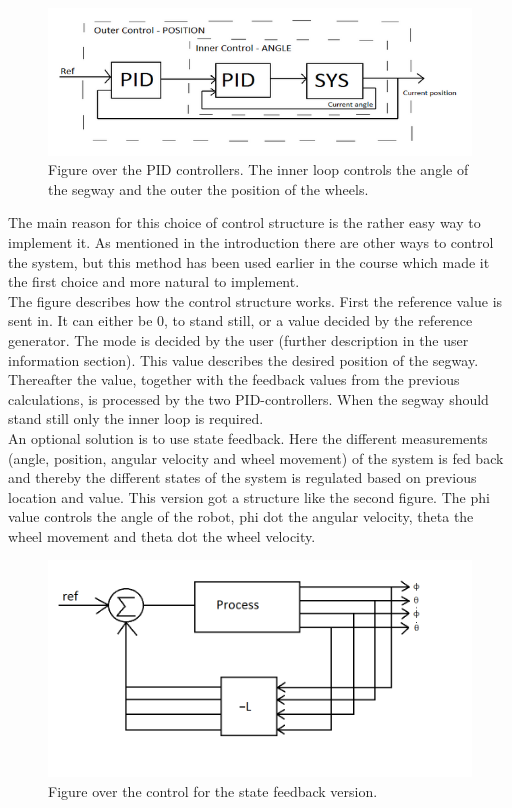 \documentclass[a4paper]{article}
\begin{document}
\begin{figure}[H]
  \centering
\includegraphics[scale=0.8]{pic/PIDs.png}
\caption{Figure over the PID controllers. The inner loop controls the angle of the segway and the outer the position of the wheels.}
\end{figure}

The main reason for this choice of control structure is the rather easy way to implement it. As mentioned in the introduction there are other ways to control the system, but this method has been used earlier in the course which made it the first choice and more natural to implement. \\

The figure describes how the control structure works. First the reference value is sent in. It can either be 0, to stand still, or a value decided by the reference generator. The mode is decided by the user (further description in the user information section). This value describes the desired position of the segway. Thereafter the value, together with the feedback values from the previous calculations, is processed by the two PID-controllers. When the segway should stand still only the inner loop is required. \\

An optional solution is to use state feedback. Here the different measurements (angle, position, angular velocity and wheel movement) of the system is fed back and thereby the different states of the system is regulated based on previous location and value. This version got a structure like the second figure. The phi value controls the angle of the robot, phi dot the angular velocity, theta the wheel movement and theta dot the wheel velocity. \\

\begin{figure}[H]
 \centering
\includegraphics[scale=0.5]{pic/Statefeedback.png}
\caption{Figure over the control for the state feedback version.}
\end{figure}
\end{document}
